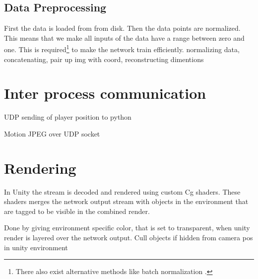 \subsection{Data Preprocessing}
First the data is loaded from from disk. Then the data points are normalized. This means that we make all inputs of the data have a range between zero and one. This is required\footnote{There also exist alternative methods like batch normalization \cite{Ioffe2015-eh}.} to make the network train efficiently.
normalizing data,
concatenating,
pair up img with coord,
reconstructing dimentions


\section{Inter process communication}
UDP sending of player position to python

Motion JPEG over UDP socket


\section{Rendering}
In Unity the stream is decoded and rendered using custom Cg shaders. These shaders merges the network output stream with objects in the environment that are tagged to be visible in the combined render.

Done by giving environment specific color, that is set to transparent, when unity render is layered over the network output.
Cull objects if hidden from camera pos in unity environment
